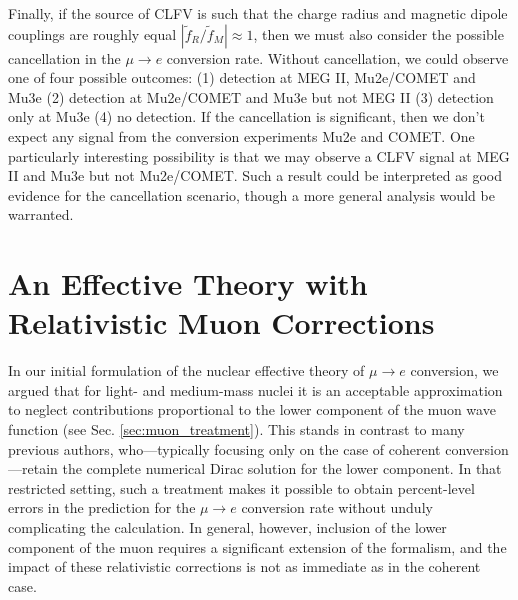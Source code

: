 \documentclass{book}[letterpaper,12pt]
\begin{document}
Finally, if the source of CLFV is such that the charge radius and magnetic dipole couplings are roughly equal $|\tilde{f}_R/\tilde{f}_M|\approx 1$, then we must also consider the possible cancellation in the $\mu\rightarrow e$ conversion rate. Without cancellation, we could observe one of four possible outcomes: (1) detection at MEG II, Mu2e/COMET and Mu3e (2) detection at Mu2e/COMET and Mu3e but not MEG II (3) detection only at Mu3e (4) no detection. If the cancellation is significant, then we don't expect any signal from the conversion experiments Mu2e and COMET. One particularly interesting possibility is that we may observe a CLFV signal at MEG II and Mu3e but not Mu2e/COMET. Such a result could be interpreted as good evidence for the cancellation scenario, though a more general analysis would be warranted.
\chapter{An Effective Theory with Relativistic Muon Corrections}
\label{chap:muon_lower}
In our initial formulation of the nuclear effective theory of $\mu\rightarrow e$ conversion, we argued that for light- and medium-mass nuclei it is an acceptable approximation to neglect contributions proportional to the lower component of the muon wave function (see Sec. \ref{sec:muon_treatment}). This stands in contrast to many previous authors, who---typically focusing only on the case of coherent conversion---retain the complete numerical Dirac solution for the lower component. In that restricted setting, such a treatment makes it possible to obtain percent-level errors in the prediction for the $\mu\rightarrow e$ conversion rate without unduly complicating the calculation. In general, however, inclusion of the lower component of the muon requires a significant extension of the formalism, and the impact of these relativistic corrections is not as immediate as in the coherent case.  
\end{document}
